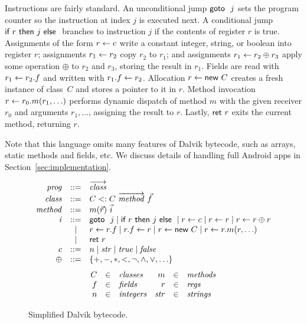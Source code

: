 Instructions are fairly standard.  An unconditional jump $\textsf{goto }\ j$ sets
the program counter so the instruction at index $j$ is executed
next. A conditional jump $\sif r j$ branches to instruction $j$ if the
contents of register $r$ is true. Assignments of the form $r \leftarrow c$
write a constant integer, string, or boolean into register $r$; assignments
$r_1 \leftarrow r_2$ copy $r_2$ to $r_1$; and assignments $r_1 \leftarrow r_2 \oplus r_3$ apply some operation $\oplus$ to $r_2$ and $r_3$,
storing the result in $r_1$. Fields are read with $r_1 \leftarrow r_2.f$ and written with $r_1.f \leftarrow r_2$. Allocation
$r \leftarrow \textsf{new}\ C$ creates a fresh instance of class~$C$ and stores a
pointer to it in $r$. Method invocation $r \leftarrow r_0.m(r_1,
  \ldots)$ performs dynamic dispatch of method $m$ with the given
receiver $r_0$ and arguments $r_1, \ldots$, assigning the result to
$r$. Lastly, $\textsf{ret}\ r$ exits the current method, returning $r$.

Note that this language omits many features of Dalvik bytecode, such
as arrays, static methods and fields, etc. We discuss details of handling
full Android apps in Section~\ref{sec:implementation}.


\begin{figure}[t]
  \centering
  \small

  \begin{displaymath}
    \begin{array}{rcl}
      \var{prog} & ::=& \overrightarrow{\var{class}} \\
      \var{class} & ::=& C <: C\ \overrightarrow{\var{method}}\ \vec{f} \\
      \var{method} & ::=& m(\vec{r})\ \vec{i} \\
      \var{i} & ::= & \sgoto j
                           \mid \sif r j
                           \mid \sassn r c
                           \mid \sassn r r
                           \mid \sassn r {r \oplus r} \\
      & \mid & \sfread r r f 
      \mid \sfwrite r f r
      \mid \snew r C
      \mid \scall r r m {r, \ldots} \\
      & \mid & \sret r \\
      c & ::= & n \mid \var{str} \mid \var{true} \mid \var{false} \\
      \oplus & ::= & \{+, -, *, <, \neg, \wedge, \vee, \ldots\} \\
    \end{array}
  \end{displaymath}
  \begin{displaymath}
    \begin{array}{rclrcl}
      C & \in & \textit{classes} & m & \in & \textit{methods} \\
      f & \in & \textit{fields} & r & \in & \textit{regs} \\
      n & \in & \textit{integers} & \mathit{str} & \in & \textit{strings}
    \end{array}
  \end{displaymath}

  \caption{Simplified Dalvik bytecode.}
  \label{fig:lang}
\end{figure}





